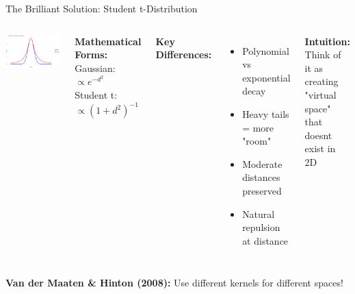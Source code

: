 \documentclass[aspectratio=169]{beamer}
\newcommand{\intuition}[1]{\colorbox{green!10}{\textcolor{intuitioncolor}{\textbf{Intuition:} #1}}}
\begin{document}
\begin{frame}{The Brilliant Solution: Student t-Distribution}
    \begin{columns}
    \includegraphics[width=\textwidth]{./Figures/gaussian_vs_t_comparison.png}
    
    \textbf{Mathematical Forms:}\\
    Gaussian: $\propto e^{-d^2}$\\
    Student t: $\propto (1+d^2)^{-1}$

\textbf{Key Differences:}
\begin{itemize}
\item Polynomial vs exponential decay
\item Heavy tails = more "room"
\item Moderate distances preserved
\item Natural repulsion at distance
\end{itemize}

\intuition{Think of it as creating "virtual space" that doesnt exist in 2D}
\end{columns}

\vspace{0.3cm}
\colorbox{green!20}{\textbf{Van der Maaten \& Hinton (2008):} Use different kernels for different spaces!}
\end{frame}
\end{document}
